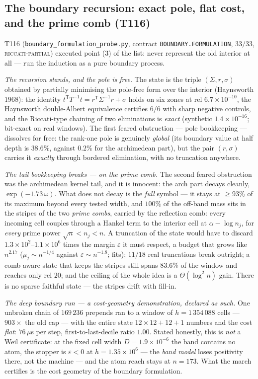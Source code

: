 \documentclass[11pt,a4paper]{article}
\begin{document}
\subsection{The boundary recursion: exact pole, flat cost, and the prime comb (T116)}
T116 (\texttt{boundary\_formulation\_probe.py}, contract \texttt{BOUNDARY.FORMULATION}, $33/33$,
\textsc{riccati-partial}) executed point (3) of the list: never represent the old interior at
all --- run the induction as a pure boundary process.

\emph{The recursion stands, and the pole is free.} The state is the triple $(\Sigma,r,\sigma)$
obtained by partially minimising the pole-free form over the interior (Haynsworth $1968$): the
identity $t^{\mathsf T}T^{-1}t=r^{\mathsf T}\Sigma^{-1}r+\sigma$ holds on six zones at
rel $6.7\times10^{-10}$, the Haynsworth double-Albert equivalence certifies $6/6$ with sharp
negative controls, and the Riccati-type chaining of two eliminations is \emph{exact} (synthetic
$1.4\times10^{-16}$; bit-exact on real windows). The first feared obstruction --- pole
bookkeeping --- dissolves for free: the rank-one pole is genuinely \emph{global} (its boundary
value at half depth is $38.6\%$, against $0.2\%$ for the archimedean part), but the pair
$(r,\sigma)$ carries it \emph{exactly} through bordered elimination, with no truncation anywhere.

\emph{The tail bookkeeping breaks --- on the prime comb.} The second feared obstruction was the
archimedean kernel tail, and it is innocent: the arch part decays cleanly, $\exp(-1.73\,\omega)$.
What does not decay is the \emph{full} symbol --- it stays at $\ge93\%$ of its maximum beyond
every tested width, and $100\%$ of the off-band mass sits in the stripes of the two \emph{prime
combs}, carried by the reflection comb: every incoming cell couples through a Hankel term to the
interior cell at $\alpha-\log n_j$, for \emph{every} prime power $\sqrt n<n_j<n$. A truncation
of the state would have to discard $1.3\times10^{2}$--$1.1\times10^{6}$ times the margin
$\varepsilon$ it must respect, a budget that grows like $n^{2.17}$
($\mu_j\sim n^{-1/4}$ against $\varepsilon\sim n^{-1.8}$; fits); $11/18$ real truncations break
outright; a comb-aware state that keeps the stripes still spans $83.6\%$ of the window and
reaches only rel $20$; and the ceiling of the whole idea is a $\Theta(\log^2 n)$ gain. There is
no sparse faithful state --- the stripes drift with fill-in.

\emph{The deep boundary run --- a cost-geometry demonstration, declared as such.} One unbroken
chain of $169\,236$ prepends ran to a window of $h=1\,354\,088$ cells --- $903\times$ the old
cap --- with the entire state $12\times12+12+1$ numbers and the cost \emph{flat}: $76\,\mu$s per
step, first-to-last-decile ratio $1.00$. Stated honestly, this is \emph{not} a Weil certificate:
at the fixed cell width $D=1.9\times10^{-6}$ the band contains no atom, the stopper is
$\varepsilon<0$ at $h=1.35\times10^{6}$ --- the \emph{band model} loses positivity there, not
the machine --- and the atom reach stays at $n=173$. What the march certifies is the cost
geometry of the boundary formulation.
\end{document}
